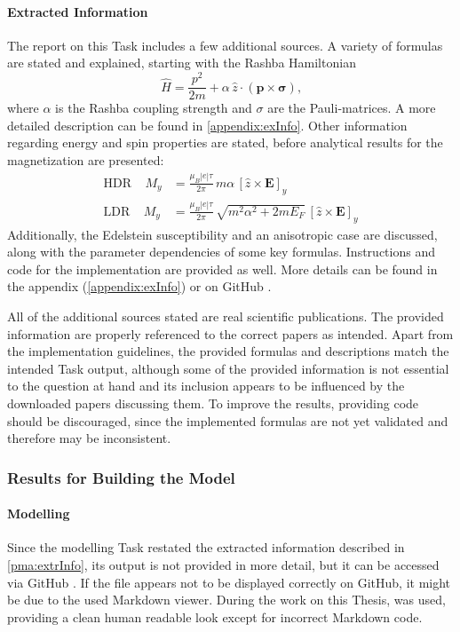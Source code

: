 \documentclass[
	fontsize = 11pt,
	paper = a4,
	draft = false,
	twoside = true,
	titlepage = false
]{scrartcl}
\numberwithin{equation}{subsection}
\begin{document}
	\paragraph{Extracted Information} \label{pma:extrInfo}
	The report on this Task includes a few additional sources. A variety of formulas are stated and explained, starting with the Rashba Hamiltonian
	\begin{equation}
		\hat{H} = \frac{p^2}{2m} + \alpha\,\hat{z}\cdot(\mathbf{p}\times\boldsymbol{\sigma}) \text{,}
	\end{equation}
	where $\alpha$ is the Rashba coupling strength and $\sigma$ are the Pauli-matrices. A more detailed description can be found in \autoref{appendix:exInfo}. Other information regarding energy and spin properties are stated, before analytical results for the magnetization are presented:
	\begin{align}
		\text{HDR} \ \ \ \ \ M_y &= \frac{\mu_B |e|\tau}{2\pi}\,m\alpha\,[\hat{z}\times\mathbf{E}]_y\\
		\text{LDR} \ \ \ \ \ M_y &= \frac{\mu_B |e|\tau}{2\pi}\,\sqrt{m^2\alpha^2 + 2mE_F}\,[\hat{z}\times\mathbf{E}]_y
	\end{align}
	Additionally, the Edelstein susceptibility and an anisotropic case are discussed, along with the parameter dependencies of some key formulas. Instructions and code for the implementation are provided as well. More details can be found in the appendix (\autoref{appendix:exInfo}) or on GitHub \autocite{gitInfo}.
	
	All of the additional sources stated are real scientific publications. The provided information are properly referenced to the correct papers as intended. Apart from the implementation guidelines, the provided formulas and descriptions match the intended Task output, although some of the provided information is not essential to the question at hand and its inclusion appears to be influenced by the downloaded papers discussing them. To improve the results, providing code should be discouraged, since the implemented formulas are not yet validated and therefore may be inconsistent.

	\subsubsection{Results for Building the Model} \label{results:model}
	\paragraph{Modelling} \label{pma:model}
	Since the modelling Task restated the extracted information described in \autoref{pma:extrInfo}, its output is not provided in more detail, but it can be accessed via GitHub \autocite{gitModel}. If the file appears not to be displayed correctly on GitHub, it might be due to the used Markdown viewer. During the work on this Thesis,  \autocite{mdView} was used, providing a clean human readable look except for incorrect Markdown code.
	
\end{document}
